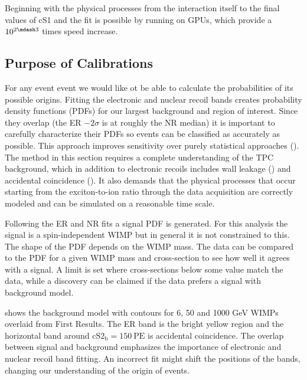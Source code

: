 Beginning with the physical processes from the interaction itself to the final values of cS1 and \cstwob the fit is
possible by running on GPUs, which provide a $10^{2 \mdash 3}$ times speed increase.



\subsection{Purpose of Calibrations}
\label{subsec:er_nr_calibrations_purpose}
For any event event we would like ot be able to calculate the probabilities of its possible origins.  Fitting the electronic and nuclear
recoil bands creates probability density functions (PDFs) for our largest background and region of interest.  Since they overlap
(the ER $-2\sigma$ is at roughly the NR median) it is important to carefully characterize their PDFs so events can be classified
as accurately as possible.  This approach improves sensitivity over
purely statistical approaches ().  The method in this section requires a complete understanding of the TPC
background, which
in addition to electronic recoils includes wall leakage () and accidental
coincidence ().  It also demands that
the physical processes that occur starting from the exciton-to-ion ratio through the data acquisition are correctly modeled and can be
simulated on a reasonable time scale.

Following the ER and NR fits a signal PDF is generated.  For this analysis the signal is a spin-independent WIMP but in general it is not
constrained to this.  The shape of the PDF depends on the WIMP mass.  The data can be compared
to the PDF for a given WIMP mass and cross-section to see how well it agrees with a signal.  A limit is set where
cross-sections below some value match the data, while a discovery can be claimed if the data prefers a signal with background model.

 shows the background model with contours for 6, 50 and 1000 GeV WIMPs overlaid from
First Results.  The ER band is the bright yellow region and the horizontal band around $\mathrm{cS2_b} = 150\ \mathrm{PE}$ is accidental
coincidence.  The overlap between signal and background emphasizes the importance of electronic and nuclear recoil band
fitting.  An incorrect fit might shift the positions of the bands, changing our understanding of the origin of events.

